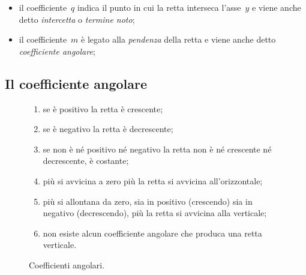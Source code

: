 \begin{itemize} [noitemsep]
 \item il coefficiente~\(q\) indica il punto in cui la retta interseca 
  l'asse~\(y\) e viene anche detto \emph{intercetta} o \emph{termine noto};
 \item il coefficiente~\(m\) è legato alla \emph{pendenza} della retta
  e viene anche detto \emph{coefficiente angolare};
\end{itemize}

\subsection{Il coefficiente angolare}


\begin{inaccessibleblock}
\begin{figure}[h]
\centering \hspace{-5mm}
\begin{minipage}{.58\textwidth}
\begin{enumerate} [nosep]
 \item se è positivo la retta è crescente;
 \item se è negativo la retta è decrescente;
 \item se non è né positivo né negativo la retta non è né crescente né
 decrescente, è costante;
 \item più si avvicina a zero più la retta si avvicina all'orizzontale;
 \item più si allontana da zero, sia in positivo (crescendo) sia in
  negativo (decrescendo), più la retta si avvicina alla verticale;
 \item non esiste alcun coefficiente angolare che produca 
  una retta verticale.
\end{enumerate}
\end{minipage}
\hfill
\begin{minipage}{.38\textwidth}
\begin{center} \coeffang \end{center}
\caption{Coefficienti angolari.}\label{fig:coeffang}
\end{minipage}
\end{figure}
\end{inaccessibleblock}


